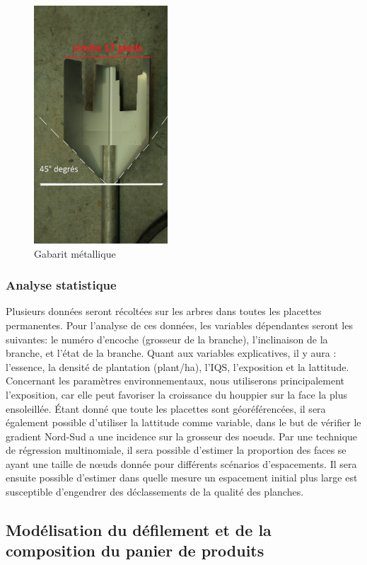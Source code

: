 \documentclass[letterpaper, 12pt]{article}
\begin{document}
\begin{onehalfspace}
\vspace{12pt}

\begin{figure}[H]
	\centering
	\includegraphics[width=5cm]{Figure4}
	\caption{Gabarit métallique}
	\label{gabarit}
\end{figure}

\subsubsection{Analyse statistique}

Plusieurs données seront récoltées sur les arbres dans toutes les placettes permanentes. Pour l'analyse de ces données, les variables dépendantes seront les suivantes: le numéro d'encoche (grosseur de la branche), l'inclinaison de la branche, et l'état de la branche. Quant aux variables explicatives, il y aura : l'essence, la densité de plantation (plant/ha), l'IQS, l'exposition et la lattitude. Concernant les paramètres environnementaux, nous utiliserons principalement l'exposition, car elle peut favoriser la croissance du houppier sur la face la plus ensoleillée. Étant donné que toute les placettes sont géoréférencées, il sera également possible d'utiliser la lattitude comme variable, dans le but de vérifier le gradient Nord-Sud a une incidence sur la grosseur des noeuds. Par une technique de régression multinomiale, il sera possible d'estimer la proportion des faces se ayant une taille de nœuds donnée pour différents scénarios d'espacements. Il sera ensuite possible d'estimer dans quelle mesure un espacement initial plus large est susceptible d'engendrer des déclassements de la qualité des planches.

\subsection{Modélisation du défilement et de la composition du panier de produits}


\end{onehalfspace}
\end{document}
